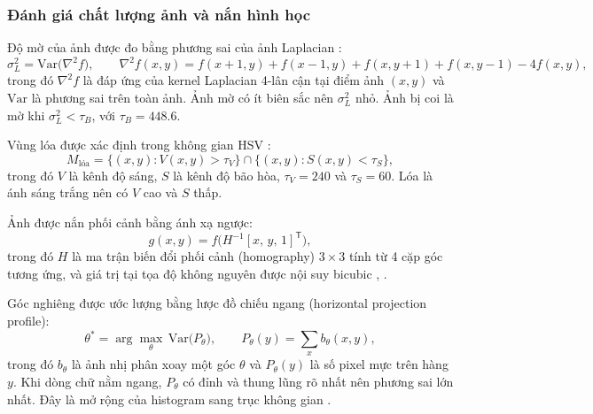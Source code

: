 \subsubsection{Đánh giá chất lượng ảnh và nắn hình học}
Độ mờ của ảnh được đo bằng phương sai của ảnh Laplacian :
\begin{equation}\label{eq:blur}
  \sigma^2_L=\mathrm{Var}\bigl(\nabla^2 f\bigr),\qquad
  \nabla^2 f(x,y)=f(x{+}1,y)+f(x{-}1,y)+f(x,y{+}1)+f(x,y{-}1)-4f(x,y),
\end{equation}
trong đó $\nabla^2 f$ là đáp ứng của kernel Laplacian 4-lân cận tại điểm ảnh $(x,y)$ và $\mathrm{Var}$ là phương sai trên toàn ảnh.
Ảnh mờ có ít biên sắc nên $\sigma^2_L$ nhỏ.
Ảnh bị coi là mờ khi $\sigma^2_L<\tau_B$, với $\tau_B=\num{448.6}$.

Vùng lóa được xác định trong không gian HSV :
\begin{equation}\label{eq:glare}
  M_{\text{lóa}}=\{(x,y): V(x,y)>\tau_V\}\cap\{(x,y): S(x,y)<\tau_S\},
\end{equation}
trong đó $V$ là kênh độ sáng, $S$ là kênh độ bão hòa, $\tau_V=240$ và $\tau_S=60$.
Lóa là ánh sáng trắng nên có $V$ cao và $S$ thấp.

Ảnh được nắn phối cảnh bằng ánh xạ ngược:
\begin{equation}\label{eq:warp}
  g(x,y)=f\bigl(H^{-1}[x,\,y,\,1]^{\mathsf T}\bigr),
\end{equation}
trong đó $H$ là ma trận biến đổi phối cảnh (homography) $3\times3$ tính từ 4 cặp góc tương ứng, và giá trị tại tọa độ không nguyên được nội suy bicubic , \cite{gonzalez2018dip}.

Góc nghiêng được ước lượng bằng lược đồ chiếu ngang (horizontal projection profile):
\begin{equation}\label{eq:skew}
  \theta^*=\arg\max_{\theta}\,\mathrm{Var}\bigl(P_\theta\bigr),\qquad P_\theta(y)=\sum_x b_\theta(x,y),
\end{equation}
trong đó $b_\theta$ là ảnh nhị phân xoay một góc $\theta$ và $P_\theta(y)$ là số pixel mực trên hàng $y$.
Khi dòng chữ nằm ngang, $P_\theta$ có đỉnh và thung lũng rõ nhất nên phương sai lớn nhất.
Đây là mở rộng của histogram sang trục không gian .

